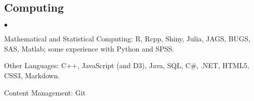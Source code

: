 \documentclass[margin,line]{res}
\newenvironment{list2}{
  \begin{list}{$\bullet$}{%
      \setlength{\itemsep}{0in}
      \setlength{\parsep}{0in} \setlength{\parskip}{0in}
      \setlength{\topsep}{0in} \setlength{\partopsep}{0in}
      \setlength{\leftmargin}{0.2in}}}{\end{list}}
\begin{document}
\begin{resume}
\section{\sc Computing}
\begin{list2}
\item Mathematical and Statistical Computing:  R, Rcpp, Shiny, Julia, JAGS, BUGS, SAS, Matlab; some experience  with Python and SPSS.
\item Other Languages: C++, JavaScript (and D3), Java, SQL, C\#, .NET, HTML5, CSS3, Markdown.
\item Content Management: Git
\end{list2}











\end{resume}
\end{document}
